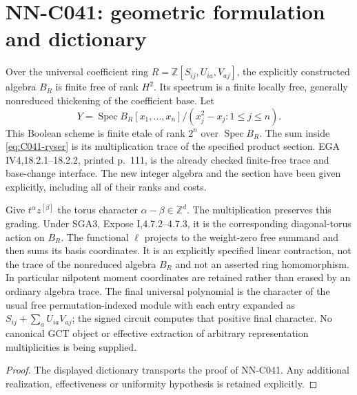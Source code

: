 \section{NN-C041: geometric formulation and dictionary}
\begin{geometricstatement}[NN-C041]
Over the universal coefficient ring
$R=\mathbb Z[S_{ij},U_{ia},V_{aj}]$, the explicitly constructed
algebra $B_R$ is finite free of rank $H^2$. Its spectrum is a
finite locally free, generally nonreduced thickening of the
coefficient base. Let
\[
 Y=\operatorname{Spec}
 B_R[x_1,\ldots,x_n]/(x_j^2-x_j:1\le j\le n).
\]
This Boolean scheme is finite etale of rank $2^n$ over
$\operatorname{Spec}B_R$. The sum inside
\eqref{eq:C041-ryser} is its multiplication trace of the
specified product section. EGA IV4,18.2.1--18.2.2, printed
p.~111, is the already checked finite-free trace and base-change
interface. The new integer algebra and the section have been
given explicitly, including all of their ranks and costs.

Give $t^\alpha z^{[\beta]}$ the torus character
$\alpha-\beta\in\mathbb Z^d$. The multiplication preserves
this grading. Under SGA3, Expose I,4.7.2--4.7.3, it is the
corresponding diagonal-torus action on $B_R$. The functional
$\ell$ projects to the weight-zero free summand and then
sums its basis coordinates. It is an explicitly specified
linear contraction, not the trace of the nonreduced algebra
$B_R$ and not an asserted ring homomorphism. In particular
nilpotent moment coordinates are retained rather than erased
by an ordinary algebra trace. The final universal polynomial
is the character of the usual free permutation-indexed
module with each entry expanded as $S_{ij}+\sum_aU_{ia}V_{aj}$;
the signed circuit computes that positive final character.
No canonical GCT object or effective extraction of arbitrary
representation multiplicities is being supplied.
\end{geometricstatement}
\begin{proof} The displayed dictionary transports the proof of NN-C041. Any additional realization, effectiveness or uniformity hypothesis is retained explicitly.\end{proof}


